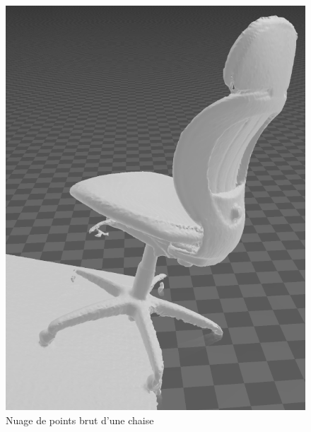 \begin{figure}[h]
    \centering
    \includegraphics[width=15cm]{images/kinect_sans_couleur.png}
    \caption{Nuage de points brut d'une chaise}
    \label{fig:kinect_1}
\end{figure}


